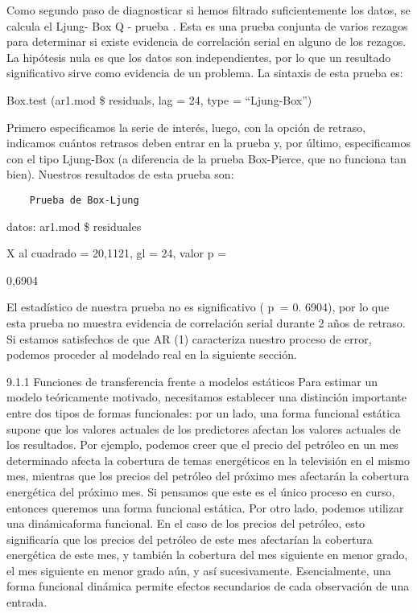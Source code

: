 \documentclass[
]{book}
\begin{document}
Como segundo paso de diagnosticar si hemos filtrado suficientemente los datos, se calcula el Ljung- Box Q - prueba . Esta es una prueba conjunta de varios rezagos para determinar si existe evidencia de correlación serial en alguno de los rezagos. La hipótesis nula es que los datos son independientes, por lo que un resultado significativo sirve como evidencia de un problema. La sintaxis de esta prueba es:

Box.test (ar1.mod \$ residuals, lag = 24, type = ``Ljung-Box'')

Primero especificamos la serie de interés, luego, con la opción de retraso, indicamos cuántos retrasos deben entrar en la prueba y, por último, especificamos con el tipo Ljung-Box (a diferencia de la prueba Box-Pierce, que no funciona tan bien). Nuestros resultados de esta prueba son:

\begin{verbatim}
    Prueba de Box-Ljung
\end{verbatim}

datos: ar1.mod \$ residuales

X al cuadrado = 20,1121, gl = 24, valor p =

0,6904

El estadístico de nuestra prueba no es significativo ( p  = 0. 6904), por lo que esta prueba no muestra evidencia de correlación serial durante 2 años de retraso. Si estamos satisfechos de que AR (1) caracteriza nuestro proceso de error, podemos proceder al modelado real en la siguiente sección.

9.1.1 Funciones de transferencia frente a modelos estáticos
Para estimar un modelo teóricamente motivado, necesitamos establecer una distinción importante entre dos tipos de formas funcionales: por un lado, una forma funcional estática supone que los valores actuales de los predictores afectan los valores actuales de los resultados. Por ejemplo, podemos creer que el precio del petróleo en un mes determinado afecta la cobertura de temas energéticos en la televisión en el mismo mes, mientras que los precios del petróleo del próximo mes afectarán la cobertura energética del próximo mes. Si pensamos que este es el único proceso en curso, entonces queremos una forma funcional estática. Por otro lado, podemos utilizar una dinámicaforma funcional. En el caso de los precios del petróleo, esto significaría que los precios del petróleo de este mes afectarían la cobertura energética de este mes, y también la cobertura del mes siguiente en menor grado, el mes siguiente en menor grado aún, y así sucesivamente. Esencialmente, una forma funcional dinámica permite efectos secundarios de cada observación de una entrada.
\end{document}
